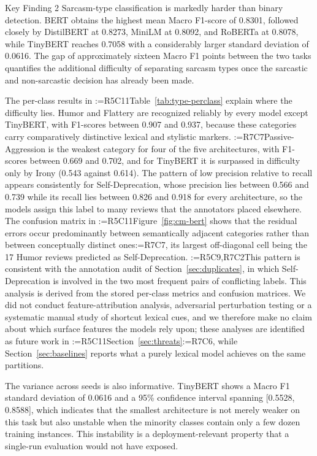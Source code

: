\documentclass[a4paper,fleqn]{cas-sc}
\makeatletter
\newif\iftracked
\newcommand{\rv@setcolour}[1]{%
  \IfStrEq{#1}{R7C7}{\color{rvEdit}}{%
    \IfSubStr{#1}{R5}{\IfSubStr{#1}{R7}{\color{rvBoth}}{\color{rvFive}}}{\color{rvSeven}}}}
\newcommand{\rv@tag}[1]{\textsuperscript{\sffamily\bfseries\scriptsize[\StrSubstitute{#1}{,}{, }]}\,}
\newcommand{\rv@recordone}[1]{%
  \edef\rv@i{#1}%
  \ifcsdef{rv@n@\rv@i}{}{\csgdef{rv@n@\rv@i}{0}}%
  \csxdef{rv@n@\rv@i}{\the\numexpr\csuse{rv@n@\rv@i}+1\relax}%
  \begingroup\edef\@currentlabel{\rv@i}\label{rv:\rv@i:\csuse{rv@n@\rv@i}}\endgroup}
\newcommand{\rv@record}[1]{\@for\rv@id:=#1\do{\expandafter\rv@recordone\expandafter{\rv@id}}}
\DeclareRobustCommand{\rc}[2]{\rv@record{#1}\iftracked{\rv@setcolour{#1}\rv@tag{#1}#2}\else#2\fi}
\DeclareRobustCommand{\rcrep}[3]{\rv@record{#1}\iftracked{\rv@setcolour{#1}\rv@tag{#1}\rv@strike{#2} #3}\else#3\fi}
\makeatother
\begin{document}
\begin{keyfinding}{Key Finding 2}\label{box:kf2}
Sarcasm-type classification is markedly harder than binary detection. BERT obtains the highest mean Macro F1-score of 0.8301, followed closely by DistilBERT at 0.8273, MiniLM at 0.8092, and RoBERTa at 0.8078, while TinyBERT reaches 0.7058 with a considerably larger standard deviation of 0.0616. The gap of approximately sixteen Macro F1 points between the two tasks quantifies the additional difficulty of separating sarcasm types once the sarcastic and non-sarcastic decision has already been made.

The per-class results in \rcrep{R5C11}{Table 7}{Table~\ref{tab:type-perclass}} explain where the difficulty lies. Humor and Flattery are recognized reliably by every model except TinyBERT, with F1-scores between 0.907 and 0.937, because these categories carry comparatively distinctive lexical and stylistic markers. \rcrep{R7C7}{Passive-Aggression is the weakest category for every architecture, with F1-scores between 0.614 and 0.702, and Irony is the second weakest. Both categories are characterized by low precision relative to recall for the minority classes, which indicates that the models overassign these labels to reviews whose pragmatic intent is ambiguous.}{Passive-Aggression is the weakest category for four of the five architectures, with F1-scores between 0.669 and 0.702, and for TinyBERT it is surpassed in difficulty only by Irony (0.543 against 0.614). The pattern of low precision relative to recall appears consistently for Self-Deprecation, whose precision lies between 0.566 and 0.739 while its recall lies between 0.826 and 0.918 for every architecture, so the models assign this label to many reviews that the annotators placed elsewhere.} The confusion matrix in \rcrep{R5C11}{Figure 5}{Figure~\ref{fig:cm-bert}} shows that the residual errors occur predominantly between semantically adjacent categories rather than between conceptually distinct ones\rc{R7C7}{, its largest off-diagonal cell being the 17 Humor reviews predicted as Self-Deprecation}. \rc{R5C9,R7C2}{This pattern is consistent with the annotation audit of Section~\ref{sec:duplicates}, in which Self-Deprecation is involved in the two most frequent pairs of conflicting labels.} This analysis is derived from the stored per-class metrics and confusion matrices. We did not conduct feature-attribution analysis, adversarial perturbation testing or a systematic manual study of shortcut lexical cues, and we therefore make no claim about which surface features the models rely upon; these analyses are identified as future work in \rcrep{R5C11}{Section 8}{Section~\ref{sec:threats}}\rc{R7C6}{, while Section~\ref{sec:baselines} reports what a purely lexical model achieves on the same partitions}.

The variance across seeds is also informative. TinyBERT shows a Macro F1 standard deviation of 0.0616 and a 95\% confidence interval spanning [0.5528, 0.8588], which indicates that the smallest architecture is not merely weaker on this task but also unstable when the minority classes contain only a few dozen training instances. This instability is a deployment-relevant property that a single-run evaluation would not have exposed.
\end{keyfinding}
\end{document}
